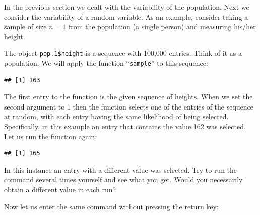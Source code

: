 \documentclass[]{krantz}
\makeatletter
\newenvironment{Shaded}{\begin{snugshade}}{\end{snugshade}}
\newcommand{\DecValTok}[1]{\textcolor[rgb]{0.00,0.00,0.81}{#1}}
\newcommand{\FloatTok}[1]{\textcolor[rgb]{0.00,0.00,0.81}{#1}}
\newcommand{\KeywordTok}[1]{\textcolor[rgb]{0.13,0.29,0.53}{\textbf{#1}}}
\newcommand{\NormalTok}[1]{#1}
\newcommand{\OperatorTok}[1]{\textcolor[rgb]{0.81,0.36,0.00}{\textbf{#1}}}
\newenvironment{kframe}{%
\medskip{}
\setlength{\fboxsep}{.8em}
 \def\at@end@of@kframe{}%
 \ifinner\ifhmode%
  \def\at@end@of@kframe{\end{minipage}}%
  \begin{minipage}{\columnwidth}%
 \fi\fi%
 \def\FrameCommand##1{\hskip\@totalleftmargin \hskip-\fboxsep
 \colorbox{shadecolor}{##1}\hskip-\fboxsep
     \hskip-\linewidth \hskip-\@totalleftmargin \hskip\columnwidth}%
 \MakeFramed {\advance\hsize-\width
   \@totalleftmargin\z@ \linewidth\hsize
   \@setminipage}}%
 {\par\unskip\endMakeFramed%
 \at@end@of@kframe}
\renewenvironment{Shaded}{\begin{kframe}}{\end{kframe}}
\theoremstyle{definition}
\theoremstyle{definition}
\theoremstyle{definition}
\theoremstyle{remark}
\makeatother
\begin{document}
In the previous section we dealt with the variability of the population.
Next we consider the variability of a random variable. As an example,
consider taking a sample of size \(n=1\) from the population (a single
person) and measuring his/her height.

The object \texttt{pop.1\$height} is a sequence with 100,000 entries. Think of
it as a population. We will apply the function ``\texttt{sample}'' to this
sequence:

\begin{Shaded}
\end{Shaded}

\begin{verbatim}
## [1] 163
\end{verbatim}

The first entry to the function is the given sequence of heights. When
we set the second argument to 1 then the function selects one of the
entries of the sequence at random, with each entry having the same
likelihood of being selected. Specifically, in this example an entry
that contains the value 162 was selected. Let us run the function again:

\begin{Shaded}
\end{Shaded}

\begin{verbatim}
## [1] 165
\end{verbatim}

In this instance an entry with a different value was selected. Try to
run the command several times yourself and see what you get. Would you
necessarily obtain a different value in each run?

Now let us enter the same command without pressing the return key:

\begin{Shaded}
\end{Shaded}
\end{document}
